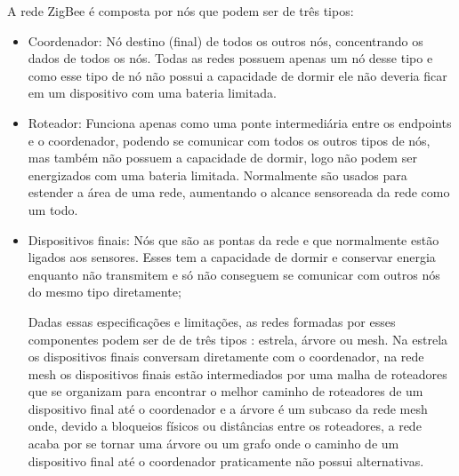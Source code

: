  A rede ZigBee é composta por nós que podem ser de três tipos:
 \begin{itemize}
\item{Coordenador}: Nó destino (final) de todos os outros nós, concentrando os dados de todos os nós. Todas as redes possuem apenas um nó desse tipo e como esse tipo de nó não possui a capacidade de dormir ele não deveria ficar em um dispositivo com uma bateria limitada.
\item{Roteador}: Funciona apenas como uma ponte intermediária entre os endpoints e o coordenador, podendo se comunicar com todos os outros tipos de nós, mas também não possuem a capacidade de dormir, logo não podem ser energizados com uma bateria limitada. Normalmente são usados para estender a área de uma rede, aumentando o alcance sensoreada da rede como um todo.
\item{Dispositivos finais}: Nós que são as pontas da rede e que normalmente estão ligados aos sensores. Esses tem a capacidade de dormir e conservar energia enquanto não transmitem e só não conseguem se comunicar com outros nós do mesmo tipo diretamente;

Dadas essas especificações e limitações, as redes formadas por esses componentes podem ser de de três tipos \cite{xbee_book}: estrela, árvore ou mesh. Na estrela os dispositivos finais conversam diretamente com o coordenador, na rede mesh os dispositivos finais estão intermediados por uma malha de roteadores que se organizam para encontrar o melhor caminho de roteadores de um dispositivo final até o coordenador e a árvore é um subcaso da rede mesh onde, devido a bloqueios físicos ou distâncias entre os roteadores, a rede acaba por se tornar uma árvore ou um grafo onde o caminho de um dispositivo final até o coordenador praticamente não possui alternativas.

\end{itemize}
